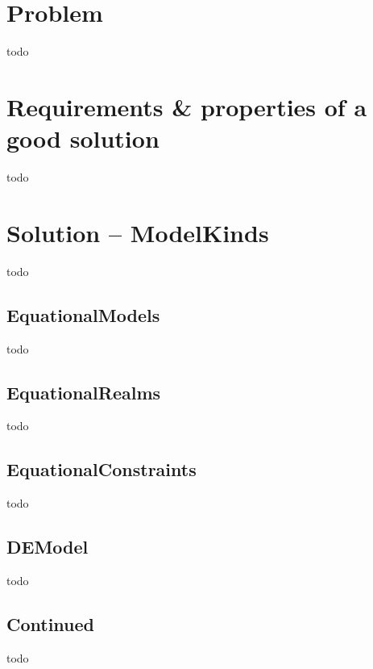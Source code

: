 \section{Problem}
todo

\section{Requirements \& properties of a good solution}
todo

\section{Solution -- ModelKinds}
todo

\subsection{EquationalModels}
todo

\subsection{EquationalRealms}
todo

\subsection{EquationalConstraints}
todo

\subsection{DEModel}
todo

\subsection{Continued}
todo
